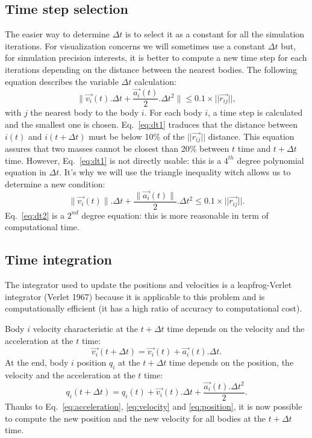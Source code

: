 \subsection{Time step selection}
The easier way to determine $\Delta t$ is to select it as a constant for all the simulation iterations.
For visualization concerns we will sometimes use a constant $\Delta t$ but, for simulation precision interests, it is better to compute a new time step for each iterations depending on the distance between the nearest bodies.
The following equation describes the variable $\Delta t$ calculation:
\begin{equation}
\label{eq:dt1}
	\|\vec{v_i}(t) . \Delta t + \frac{\vec{a_i}(t)}{2} . \Delta t^2 \| \leq 0.1 \times ||\vec{r_{ij}}||,
\end{equation}
with $j$ the nearest body to the body $i$.
For each body $i$, a time step is calculated and the smallest one is chosen.
Eq.~\ref{eq:dt1} traduces that the distance between $i(t)$ and $i(t + \Delta t)$ must be below 10\% of the $||\vec{r_{ij}}||$ distance.
This equation assures that two masses cannot be closest than 20\% between $t$ time and $t + \Delta t$ time.
However, Eq.~\ref{eq:dt1} is not directly usable: this is a $4^{th}$ degree polynomial equation in $\Delta t$.
It's why we will use the triangle inequality witch allows us to determine a new condition:
\begin{equation}
\label{eq:dt2}
	\|\vec{v_i}(t)\| . \Delta t + \frac{\|\vec{a_i}(t)\|}{2} . \Delta t^2  \leq 0.1 \times ||\vec{r_{ij}}||.
\end{equation}
Eq.~\ref{eq:dt2} is a $2^{nd}$ degree equation: this is more reasonable in term of computational time.

\subsection{Time integration}
The integrator used to update the positions and velocities is a leapfrog-Verlet integrator (Verlet 1967) because it is applicable to this problem and is computationally efficient (it has a high ratio of accuracy to computational cost).

Body $i$ velocity characteristic at the $t + \Delta t$ time depends on the velocity and the acceleration at the $t$ time:
\begin{equation}
\label{eq:velocity}
	\vec{v_i}(t + \Delta t) = \vec{v_{i}}(t) + \vec{a_i}(t) . \Delta t.
\end{equation}
At the end, body $i$ position $q_i$ at the $t + \Delta t$ time depends on the position, the velocity and the acceleration at the $t$ time:
\begin{equation}
\label{eq:position}
	q_i(t + \Delta t) = q_{i}(t) + \vec{v_{i}}(t) . \Delta t + \frac{\vec{a_i}(t) . \Delta t^2}{2}.
\end{equation}
Thanks to Eq.~\ref{eq:acceleration}, \ref{eq:velocity} and \ref{eq:position}, it is now possible to compute the new position and the new velocity for all bodies at the $t + \Delta t$ time.
